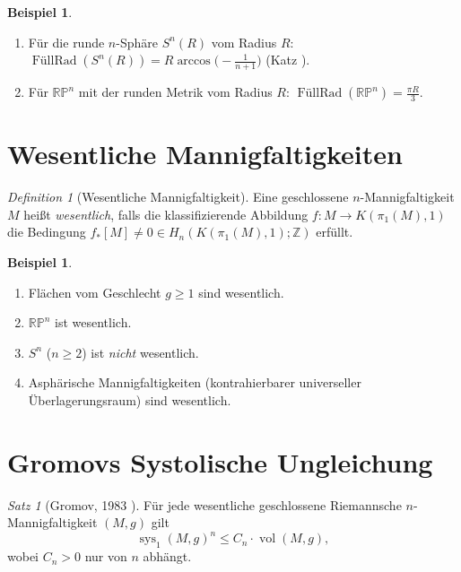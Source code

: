 \documentclass[12pt,a4paper]{amsart}
\theoremstyle{definition}
\newtheorem{example}[theorem]{Beispiel}
\theoremstyle{remark}
\newtheorem{satz}[theorem]{Satz}
\newtheorem{definition_de}[theorem]{Definition}
\DeclareMathOperator{\sys}{sys}
\DeclareMathOperator{\FillRad}{FüllRad}
\DeclareMathOperator{\vol}{vol}
\newcommand{\ZZ}{\mathbb{Z}}
\newcommand{\RP}{\mathbb{RP}}
\begin{document}
\begin{example}
\begin{enumerate}[label=(\roman*)]
  \item Für die runde $n$-Sphäre $S^n(R)$ vom Radius $R$:
        $\FillRad(S^n(R)) = R \arccos\!\bigl(-\tfrac{1}{n+1}\bigr)$
        (Katz \cite{Katz1983}).
  \item Für $\RP^n$ mit der runden Metrik vom Radius $R$:
        $\FillRad(\RP^n) = \tfrac{\pi R}{3}$.
\end{enumerate}
\end{example}

\section{Wesentliche Mannigfaltigkeiten}

\begin{definition_de}[Wesentliche Mannigfaltigkeit]
Eine geschlossene $n$-Mannigfaltigkeit $M$ heißt \emph{wesentlich}, falls
die klassifizierende Abbildung $f \colon M \to K(\pi_1(M), 1)$ die
Bedingung $f_*[M] \neq 0 \in H_n(K(\pi_1(M),1);\ZZ)$ erfüllt.
\end{definition_de}

\begin{example}
\begin{enumerate}[label=(\roman*)]
  \item Flächen vom Geschlecht $g \ge 1$ sind wesentlich.
  \item $\RP^n$ ist wesentlich.
  \item $S^n$ ($n \ge 2$) ist \emph{nicht} wesentlich.
  \item Asphärische Mannigfaltigkeiten (kontrahierbarer universeller Überlagerungsraum)
        sind wesentlich.
\end{enumerate}
\end{example}

\section{Gromovs Systolische Ungleichung}

\begin{satz}[Gromov, 1983 \cite{Gromov1983}]
\label{satz:gromov-systolisch}
Für jede wesentliche geschlossene Riemannsche $n$-Mannigfaltigkeit $(M,g)$ gilt
\[
  \sys_1(M,g)^n \le C_n \cdot \vol(M,g),
\]
wobei $C_n > 0$ nur von $n$ abhängt.
\end{satz}
\end{document}

